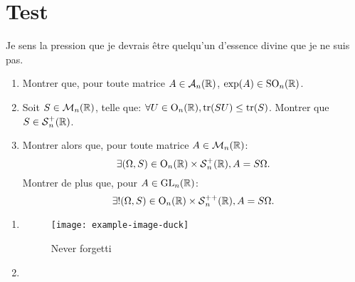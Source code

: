\documentclass{compte-rendu} %
\begin{document}
\section{Test}
\lipsum[1-2]

\begin{citation}
Je sens la pression que je devrais être quelqu'un d'essence divine que je ne suis pas.
\end{citation}

\begin{question}
\begin{enumerate}
    \item Montrer que, pour toute matrice \(A\in\operatorname{\mathcal A}_n(\mathbb{R})\), \(\exp(A)\in\operatorname{SO}_n(\mathbb{R})\).
    \item Soit $S\in\M$, telle que: \(\forall U\in\operatorname{O}_n(\mathbb{R}), \operatorname{tr}(SU) \leq \operatorname{tr}(S)\). Montrer que \(S\in \operatorname{\mathcal S}_n^{+}(\mathbb{R})\).
    \item Montrer alors que, pour toute matrice \(A\in\M\):
\[
    \exists (\Omega, S) \in \operatorname{O}_n(\mathbb{R})\times \operatorname{\mathcal S}_n^+(\mathbb{R}), A = S \Omega
.\]
    Montrer de plus que, pour $A\in\operatorname{GL}_n(\mathbb{R})$:
\[
    \exists! (\Omega, S) \in \operatorname{O}_n(\mathbb{R})\times \operatorname{\mathcal S}_n^{++}(\mathbb{R}), A = S \Omega
.\] 
\end{enumerate}
\end{question}

\begin{enumerate}
\item \lipsum[17]

\begin{figure}[ht]
    \centering
    \texttt{[image: example-image-duck]}
    \caption{Never forgetti}
\end{figure}
\item \lipsum[18]
\end{enumerate}
\end{document}
